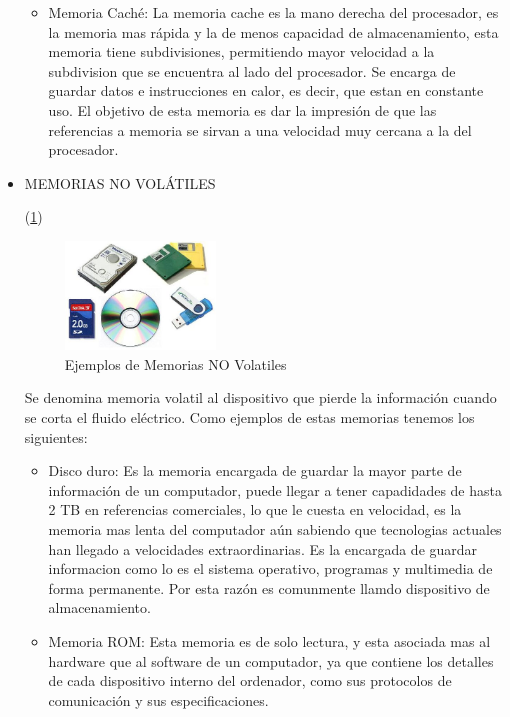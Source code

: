 \documentclass{article}
\begin{document}
\begin{itemize}
\begin{itemize}
        \item
        Memoria Caché: La memoria cache es la mano derecha del procesador, es la memoria mas rápida y la de menos capacidad de almacenamiento, esta memoria tiene subdivisiones, permitiendo mayor velocidad a la subdivision que se encuentra al lado del procesador. Se encarga de guardar datos e instrucciones en calor, es decir, que estan en constante uso. El objetivo de esta memoria es dar la impresión de que las referencias a memoria se sirvan  a una velocidad muy cercana  a la del procesador.
    
    \end{itemize}
    
    \item
    MEMORIAS NO VOLÁTILES
    
    (\ref{fig:Novolatil})

    \begin{figure}[h]
    \includegraphics[width=4cm]{No-volatiles.jpg}
    \centering
    \caption{Ejemplos de Memorias NO Volatiles}
    \label{fig:Novolatil}
    \end{figure}
    
    Se denomina memoria volatil al dispositivo que pierde la información cuando se corta el fluido eléctrico. Como ejemplos de estas memorias tenemos los siguientes:
    \begin{itemize}
        \item
        Disco duro: Es la memoria encargada de guardar la mayor parte de información de un computador, puede llegar a tener capadidades de hasta 2 TB en referencias comerciales, lo que le cuesta en velocidad, es la memoria mas lenta del computador aún sabiendo que tecnologias actuales han llegado a velocidades extraordinarias. Es la encargada de guardar informacion como lo es el sistema operativo, programas y multimedia de forma permanente. Por esta razón es comunmente llamdo dispositivo de almacenamiento.
        
        \item
        Memoria ROM: Esta memoria es de solo lectura, y esta asociada mas al hardware que al software de un computador, ya que contiene los detalles de cada dispositivo interno del ordenador, como sus protocolos de comunicación y sus especificaciones.
        

\end{itemize}
\end{itemize}
\end{document}
